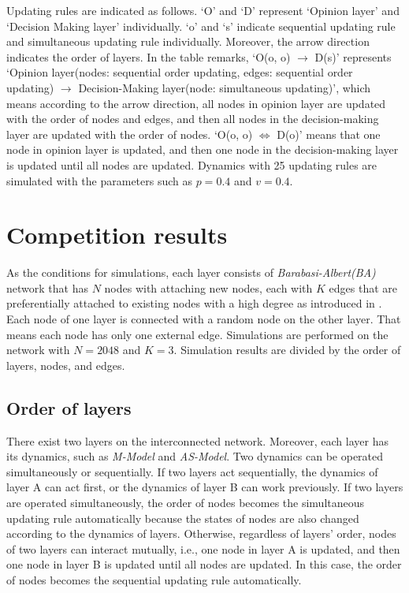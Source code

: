 Updating rules are indicated as follows. `O' and `D'  represent `Opinion layer' and `Decision Making layer' individually. `o' and `s' indicate sequential updating rule and simultaneous updating rule individually. Moreover, the arrow direction indicates the order of layers. In the table remarks, `O(o, o) $\to$ D(s)' represents `Opinion layer(nodes: sequential order updating, edges: sequential order updating) $\to$ Decision-Making layer(node: simultaneous updating)', which means according to the arrow direction, all nodes in opinion layer are updated with the order of nodes and edges, and then all nodes in the decision-making layer are updated with the order of nodes. `O(o, o) $\Leftrightarrow$ D(o)' means that one node in opinion layer is updated, and then one node in the decision-making layer is updated until all nodes are updated. Dynamics with 25 updating rules are simulated with the parameters such as $p=0.4$ and $v=0.4$. \\

\section{Competition results}
As the conditions for simulations, each layer consists of \textit{Barabasi-Albert(BA)} network that has $N$ nodes with attaching new nodes, each with $K$ edges that are preferentially attached to existing nodes with a high degree as introduced in \parencite{barabasi1999}. Each node of one layer is connected with a random node on the other layer. That means each node has only one external edge. Simulations are performed on the network with $N=2048$ and $K=3$. Simulation results are divided by the order of layers, nodes, and edges.\\

\subsection{Order of layers}
\label{order of layer}
There exist two layers on the interconnected network. Moreover, each layer has its dynamics, such as \textit{M-Model} and \textit{AS-Model}. Two dynamics can be operated simultaneously or sequentially. If two layers act sequentially, the dynamics of layer A can act first, or the dynamics of layer B can work previously. If two layers are operated simultaneously, the order of nodes becomes the simultaneous updating rule automatically because the states of nodes are also changed according to the dynamics of layers. Otherwise, regardless of layers' order, nodes of two layers can interact mutually, i.e., one node in layer A is updated, and then one node in layer B is updated until all nodes are updated. In this case, the order of nodes becomes the sequential updating rule automatically.

